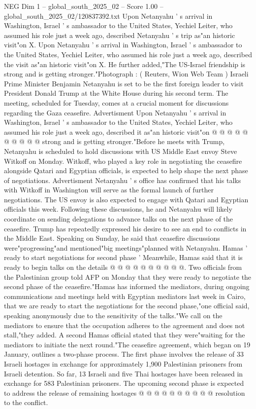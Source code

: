 \begin{textsample}{NEG Dim 1 – global\_south\_2025\_02 – Score 1.00 – global\_south\_2025\_02/120837392.txt}  \label{ex:f1_neg_096}
Upon Netanyahu ' s arrival in Washington, Israel ' s ambassador to the United States, Yechiel Leiter, who assumed his role just a week ago, described Netanyahu ' s trip as"an historic visit"on X.
Upon Netanyahu ' s arrival in Washington, Israel ' s ambassador to the United States, Yechiel Leiter, who assumed his role just a week ago, described the visit as"an historic visit"on X.
He further added,"The US-Israel friendship is strong and is getting stronger."Photograph : ( Reuters, Wion Web Team ) Israeli Prime Minister Benjamin Netanyahu is set to be the first foreign leader to visit President Donald Trump at the White House during his second term.
The meeting, scheduled for Tuesday, comes at a crucial moment for discussions regarding the Gaza ceasefire.
Advertisment Upon Netanyahu ' s arrival in Washington, Israel ' s ambassador to the United States, Yechiel Leiter, who assumed his role just a week ago, described it as"an historic visit"on @ @ @ @ @ @ @ @ @ @ strong and is getting stronger."Before he meets with Trump, Netanyahu is scheduled to hold discussions with US Middle East envoy Steve Witkoff on Monday.
Witkoff, who played a key role in negotiating the ceasefire alongside Qatari and Egyptian officials, is expected to help shape the next phase of negotiations.
Advertisment Netanyahu ' s office has confirmed that his talks with Witkoff in Washington will serve as the formal launch of further negotiations.
The US envoy is also expected to engage with Qatari and Egyptian officials this week.
Following these discussions, he and Netanyahu will likely coordinate on sending delegations to advance talks on the next phase of the ceasefire.
Trump has repeatedly expressed his desire to see an end to conflicts in the Middle East.
Speaking on Sunday, he said that ceasefire discussions were"progressing"and mentioned"big meetings"planned with Netanyahu.
Hamas ' ready to start negotiations for second phase ' Meanwhile, Hamas said that it is ready to begin talks on the details @ @ @ @ @ @ @ @ @ @.
Two officials from the Palestinian group told AFP on Monday that they were ready to negotiate the second phase of the ceasefire."Hamas has informed the mediators, during ongoing communications and meetings held with Egyptian mediators last week in Cairo, that we are ready to start the negotiations for the second phase,"one official said, speaking anonymously due to the sensitivity of the talks."We call on the mediators to ensure that the occupation adheres to the agreement and does not stall,"they added.
A second Hamas official stated that they were"waiting for the mediators to initiate the next round."The ceasefire agreement, which began on 19 January, outlines a two-phase process.
The first phase involves the release of 33 Israeli hostages in exchange for approximately 1,900 Palestinian prisoners from Israeli detention.
So far, 13 Israeli and five Thai hostages have been released in exchange for 583 Palestinian prisoners.
The upcoming second phase is expected to address the release of remaining hostages @ @ @ @ @ @ @ @ @ @ resolution to the conflict.

\end{textsample}
